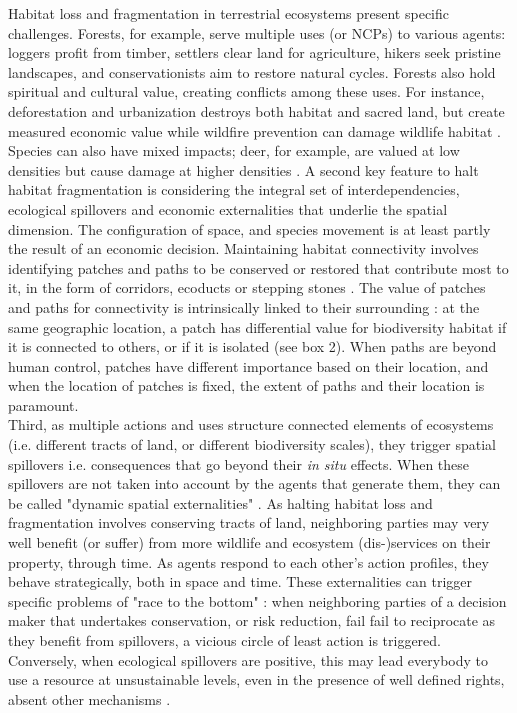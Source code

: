 Habitat loss and fragmentation in terrestrial ecosystems present specific challenges. Forests, for example, serve multiple uses (or NCPs) to various agents: loggers profit from timber, settlers clear land for agriculture, hikers seek pristine landscapes, and conservationists aim to restore natural cycles. Forests also hold spiritual and cultural value, creating conflicts among these uses. For instance, deforestation and urbanization destroys both habitat and sacred land, but create measured economic value \citep{giglio_economics_2024} while wildfire prevention can damage wildlife habitat \citep{bradshaw2018}. Species can also have mixed impacts; deer, for example, are valued at low densities but cause damage at higher densities \citep{putman_identifying_2011}. 
A second key feature to halt habitat fragmentation is considering the integral set of interdependencies, ecological spillovers and economic externalities that underlie the spatial dimension. The configuration of space, and species movement is at least partly the result of an economic decision. Maintaining habitat connectivity involves identifying patches and paths to be conserved or restored that contribute most to it, in the form of corridors, ecoducts or stepping stones \citep{Turner2005, Turner2011}. The value of patches and paths for connectivity is intrinsically linked to their surrounding : at the same geographic location, a patch has differential value for biodiversity habitat if it is connected to others, or if it is isolated (see box 2). When paths are beyond human control, patches have different importance based on their location, and when the location of patches is fixed, the extent of paths and their location is paramount.
\\
Third, as multiple actions and uses structure connected elements of ecosystems (i.e. different tracts of land, or different biodiversity scales), they trigger spatial spillovers i.e. consequences that go beyond their \textit{in situ} effects. When these spillovers are not taken into account by the agents that generate them, they can be called "dynamic spatial externalities" \citep{sanchirico_bioeconomics_1999, costello_optimal_2008, costello_private_2017}. As halting habitat loss and fragmentation involves conserving tracts of land, neighboring parties may very well benefit (or suffer) from more wildlife and ecosystem (dis-)services on their property, through time. As agents respond to each other's action profiles, they behave strategically, both in space and time. These externalities can trigger specific problems of "race to the bottom" \citep{costello_private_2017} : when neighboring parties of a decision maker that undertakes conservation, or risk reduction, fail fail to reciprocate as they benefit from spillovers, a vicious circle of least action is triggered. Conversely, when ecological spillovers are positive, this may lead everybody to use a resource at unsustainable levels, even in the presence of well defined rights, absent other mechanisms \citep{janmaat_sharing_2005,kaffine_unitization_2010}. 
